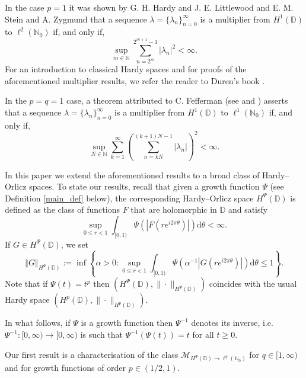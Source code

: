 \documentclass[a4paper, leqno, 10pt]{amsart}
\numberwithin{equation}{section}
\newcommand{\dd}{\mathrm{d}}
\newcommand{\norm}[1]{\left\Vert#1\right\Vert}
\newcommand{\abs}[1]{\left|#1\right|}
\newcommand{\D}{\mathbb{D}}
\newcommand{\N}{\mathbb{N}}
\begin{document}
In the case $p=1$ it was shown by G. H. Hardy and J. E. Littlewood \cites{H-L_37,H-L_41} and E. M. Stein and A. Zygmund \cite{SZ} that a sequence $\lambda = \{ \lambda_n \}_{n=0}^{\infty}$ is a multiplier from $H^1(\D)$ to $\ell^2 (\N_0)$ if, and only if,  
\begin{equation}\label{H1_l2}
\sup_{m \in \N} \sum_{n=2^m}^{2^{m+1}-1} |\lambda_n|^2 < \infty.
\end{equation}
For an introduction to classical Hardy spaces and for proofs of the aforementioned multiplier results, we refer the reader to Duren's book \cite{D}. 

In the $p=q=1$ case, a theorem attributed to C. Fefferman (see \cite{Dy} and \cite{Sl-St}) asserts that a sequence $\lambda = \{ \lambda_n \}_{n=0}^{\infty}$ is a multiplier from $H^1(\D)$ to $\ell^1 (\N_0)$ if, and only if,   
\begin{equation}\label{H1_l1}
\sup_{N \in \N} \sum_{k=1}^\infty \left(\sum_{n= k N}^{(k+1)N -1} |\lambda_n| \right)^2  < \infty.
\end{equation}

In this paper we extend the aforementioned results to a broad class of Hardy--Orlicz spaces. To state our results, recall that given a growth function $\Psi$ (see Definition \ref{main_def} below), the corresponding Hardy--Orlicz space $H^{\Psi} (\D)$ is defined as the class of functions $F$ that are holomorphic in $\D$ and satisfy
\[
\sup_{0 \leq r <1} \int_{[0,1)} \Psi \left( \abs{F \left(r e^{i 2\pi \theta}\right)} \right) \dd \theta < \infty.
\]
If $G \in H^{\Psi} (\D)$, we set
\[
\norm{G}_{H^{\Psi} (\D)} := \inf \left\{ \alpha >0 : \sup_{0 \leq r <1} \int_{[0,1)} \Psi \left(\alpha^{-1} \abs{G \left(r e^{i 2\pi \theta} \right)} \right) \dd \theta \leq 1 \right\}.
\]
Note that if $\Psi (t)=t^p$ then $( H^{\Psi} (\D), \| \cdot \|_{H^{\Psi} (\D)})$ coincides with the usual Hardy space $( H^p (\D), \| \cdot \|_{H^p (\D)})$. 

In what follows, if $\Psi$ is a growth function then $\Psi^{-1}$ denotes its inverse, i.e. $\Psi^{-1}: [0, \infty) \rightarrow [0, \infty)$ is such that  $\Psi^{-1} ( \Psi (t)) = t $ for all $t \geq 0$.

Our first result is a characterisation of the class $\mathcal{M}_{H^{\Psi} (\D) \rightarrow \ell^q (\N_0)}$ for $q \in [1, \infty)$ and for growth functions of order $p \in (1/2,1)$. 
\end{document}

